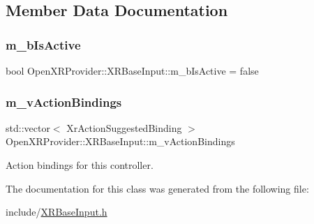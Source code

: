 \subsection{Member Data Documentation}
\mbox{\label{class_open_x_r_provider_1_1_x_r_base_input_ac4e9180e8d2f782656c8e129f7555f17}} 
\subsubsection{\texorpdfstring{m\_bIsActive}{m\_bIsActive}}
{\footnotesize\ttfamily bool Open\+X\+R\+Provider\+::\+X\+R\+Base\+Input\+::m\+\_\+b\+Is\+Active = false\hspace{0.3cm}{\ttfamily [private]}}

\mbox{\label{class_open_x_r_provider_1_1_x_r_base_input_a52671a8bf80fb2c176d1bebde57ccc21}} 
\subsubsection{\texorpdfstring{m\_vActionBindings}{m\_vActionBindings}}
{\footnotesize\ttfamily std\+::vector$<$ Xr\+Action\+Suggested\+Binding $>$ Open\+X\+R\+Provider\+::\+X\+R\+Base\+Input\+::m\+\_\+v\+Action\+Bindings\hspace{0.3cm}{\ttfamily [private]}}



Action bindings for this controller. 



The documentation for this class was generated from the following file\+:\begin{DoxyCompactItemize}
\item 
include/\mbox{\hyperlink{_x_r_base_input_8h}{X\+R\+Base\+Input.\+h}}\end{DoxyCompactItemize}
